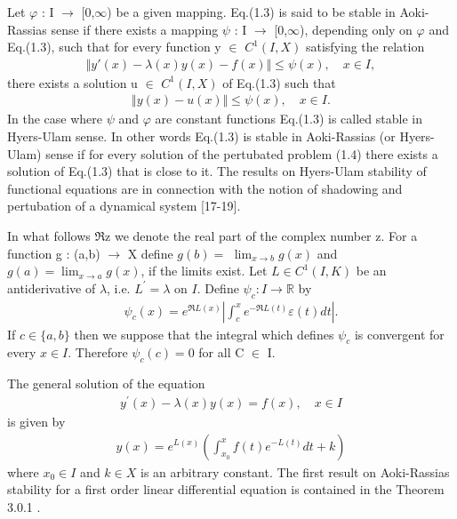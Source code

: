 \documentclass[a4paper,12pt]{report}
\begin{document}
\begin{defn}
	Let $\varphi$ : I $\rightarrow$ [0,$\infty$) be a given mapping. Eq.(1.3) is said to be stable in Aoki-Rassias sense if there exists a mapping \linebreak $\psi$ : I $\rightarrow$ [0,$\infty$), depending only on $\varphi$ and Eq.(1.3), such that for every function y $\in$ $C^1(I,X)$ satisfying the relation 
	\begin{eqnarray}
	\Vert y'(x) - \lambda(x)y(x) - f(x) \Vert \le \psi(x), \quad x \in I,
	\end{eqnarray}
	there exists a solution u $\in$ $C^1(I,X)$ of Eq.(1.3) such that
	\begin{eqnarray}
		\Vert y(x) - u(x) \Vert \le \psi(x), \quad  x \in I.
	\end{eqnarray}
\indent In the case where $\psi$ and $\varphi$ are constant functions Eq.(1.3) is called stable in Hyers-Ulam sense. In other words Eq.(1.3) is stable in Aoki-Rassias (or Hyers-Ulam) sense if for every solution of the \linebreak pertubated problem (1.4) there exists a solution of Eq.(1.3) that is close to it. The results on Hyers-Ulam stability of functional equations are in connection with the notion of shadowing and pertubation  of a dynamical system [17-19]. 
\end{defn}	
\begin{defn}
	 In what follows $\Re$z we denote the real part \linebreak of the complex number z. For a function g : (a,b) $\rightarrow$ X define \linebreak $g(b)=$ $\lim _{x \rightarrow b} g(x)$  and $g(a)=\lim _{x \rightarrow a} g(x)$, if the limits exist. Let $L \in C^{1}(I, K)$ be an antiderivative of $\lambda$, i.e. $L^{\prime}=\lambda$ on $I$. Define $\psi_{c}: I \rightarrow \mathbb{R}$ by
	 \begin{eqnarray}
	 	\psi_{c}(x)=e^{\Re L(x)}\left|\int_{c}^{x} e^{-\Re L(t)} \varepsilon(t) d t\right|.
	 \end{eqnarray}
 	If $c \in\{a, b\}$ then we suppose that the integral which defines $\psi_{c}$ is convergent for every $x \in I$. Therefore $\psi_{c}(c)=0$ for all C $\in$ I.
\end{defn}	
\begin{Lem}
	 The general solution of the equation
	 \begin{eqnarray}
	 	y^{\prime}(x)-\lambda(x) y(x)=f(x), \quad x \in I
	 \end{eqnarray}
 is given by
 \begin{eqnarray}
 		y(x)=e^{L(x)}\left(\int_{x_{0}}^{x} f(t) e^{-L(t)} d t+k\right)
 \end{eqnarray}
	where $x_{0} \in I$ and $k \in X$ is an arbitrary constant.
	The first result on Aoki-Rassias stability for a first order linear differential equation is contained in the Theorem 3.0.1 .
\end{Lem}	
\end{document}
